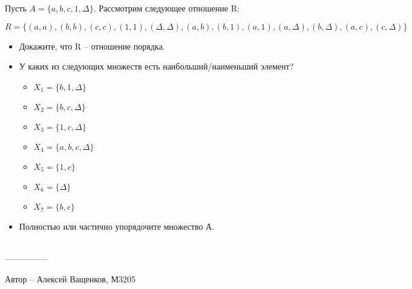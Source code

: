 \question
Пусть $A = \{a, b, c, 1, \Delta\}$. Рассмотрим следующее отношение R:

\begin{equation*}
R = \{(a, a), (b, b), (c, c), (1, 1),
(\Delta, \Delta), (a, b), (b, 1), (a, 1),
(a, \Delta), (b, \Delta), (a, c), (c, \Delta)\}
\end{equation*}
\begin{itemize}
    \item Докажите, что R -- отношение порядка.
    \item У каких из следующих множеств есть наибольший/наименьший элемент?
    \begin{itemize}
        \item $X_1 = \{b, 1, \Delta\}$
        \item $X_2 = \{b, c, \Delta\}$
        \item $X_3 = \{1, c, \Delta\}$
        \item $X_4 = \{a, b, c, \Delta\}$
        \item $X_5 = \{1, c\}$
        \item $X_6 = \{ \Delta \}$
        \item $X_7 = \{b, c\}$
    \end{itemize}
    \item Полностью или частично упорядочите множество А.
\end{itemize}
\\
---------------

Автор -- Алексей Ващенков, М3205